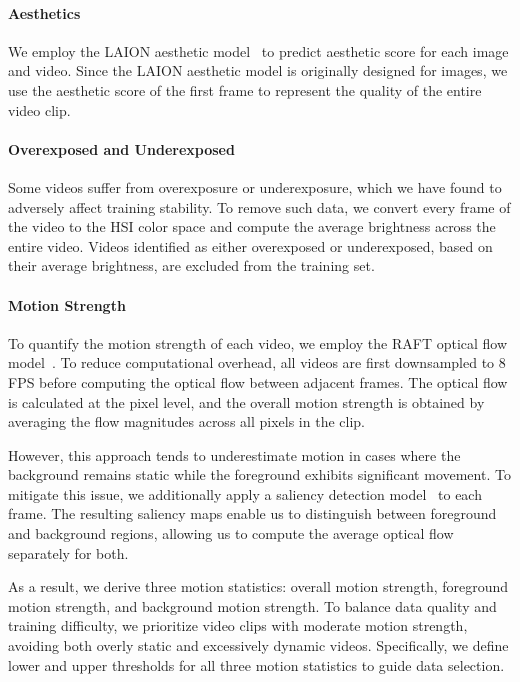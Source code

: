 \paragraph{Aesthetics}
We employ the LAION aesthetic model~\citep{schuhmann2022laion} to predict aesthetic score for each image and video. Since the LAION aesthetic model is originally designed for images, we use the aesthetic score of the first frame to represent the quality of the entire video clip.

\paragraph{Overexposed and Underexposed}
Some videos suffer from overexposure or underexposure, which we have found to adversely affect training stability. To remove such data, we convert every frame of the video to the HSI color space and compute the average brightness across the entire video. Videos identified as either overexposed or underexposed, based on their average brightness, are excluded from the training set.

\paragraph{Motion Strength}
To quantify the motion strength of each video, we employ the RAFT optical flow model~\citep{teed2020raft}. To reduce computational overhead, all videos are first downsampled to 8 FPS before computing the optical flow between adjacent frames. The optical flow is calculated at the pixel level, and the overall motion strength is obtained by averaging the flow magnitudes across all pixels in the clip.

However, this approach tends to underestimate motion in cases where the background remains static while the foreground exhibits significant movement. To mitigate this issue, we additionally apply a saliency detection model~\citep{zhao2019pyramid} to each frame. The resulting saliency maps enable us to distinguish between foreground and background regions, allowing us to compute the average optical flow separately for both.

As a result, we derive three motion statistics: overall motion strength, foreground motion strength, and background motion strength. To balance data quality and training difficulty, we prioritize video clips with moderate motion strength, avoiding both overly static and excessively dynamic videos. Specifically, we define lower and upper thresholds for all three motion statistics to guide data selection.

